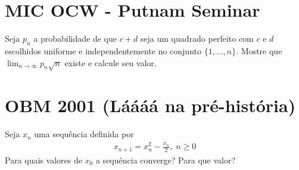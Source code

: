 \section{MIC OCW - Putnam Seminar}

Seja $p_n$ a probabilidade de que $c+d$ seja um quadrado perfeito com $c$ e $d$ escolhidos uniforme e independentemente no conjunto $\{1,\dots,n\}$. Mostre que $\lim_{n\to \infty} p_n\sqrt{n}$ existe e calcule seu valor.

\section{OBM 2001 (Láááá na pré-história)}

Seja $x_n$ uma sequência definida por
\begin{align}
    x_{n+1} = x^2_{n} - \frac{x_n}{2},\; n \ge 0
\end{align}
Para quais valores de $x_0$ a sequência converge? Para que valor?